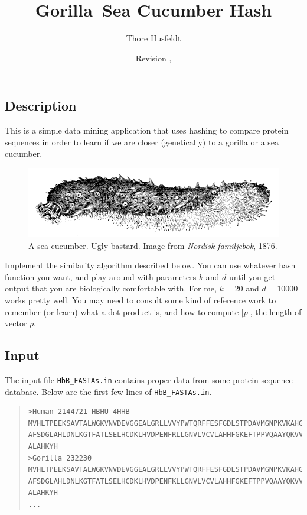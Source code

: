 \documentclass{tufte-handout}
\title{Gorilla--Sea Cucumber Hash}
\author{Thore Husfeldt}
\date{\small Revision \GITAbrHash, \GITAuthorDate}
\begin{document}
\maketitle

\subsection{Description}
This is a simple data mining application that uses hashing to compare protein sequences in order to learn if we are closer (genetically) to a gorilla or a sea cucumber.

\begin{figure}
  \includegraphics[width=\textwidth]{sea_cucumber.png}
  \caption{A sea cucumber. Ugly bastard.
  Image from \emph{Nordisk familjebok}, 1876.}
\end{figure}

Implement the similarity algorithm described below.
You can use whatever hash function you want, and play around with parameters $k$ and $d$ until you get output that you are biologically comfortable with.
For me, $k=20$ and $d=10000$ works pretty well.
You may need to consult some kind of reference work to remember (or learn) what a dot product is, and how to compute $|p|$, the length of vector $p$.

\subsection{Input}
The input file {\tt HbB\_FASTAs.in} contains proper data from some protein sequence database.
Below are the first few lines of {\tt HbB\_FASTAs.in}.

\begin{fullwidth}
  \begin{quote}
\begin{verbatim}
>Human 2144721 HBHU 4HHB
MVHLTPEEKSAVTALWGKVNVDEVGGEALGRLLVVYPWTQRFFESFGDLSTPDAVMGNPKVKAHGKKVLG
AFSDGLAHLDNLKGTFATLSELHCDKLHVDPENFRLLGNVLVCVLAHHFGKEFTPPVQAAYQKVVAGVAN
ALAHKYH
>Gorilla 232230
MVHLTPEEKSAVTALWGKVNVDEVGGEALGRLLVVYPWTQRFFESFGDLSTPDAVMGNPKVKAHGKKVLG
AFSDGLAHLDNLKGTFATLSELHCDKLHVDPENFKLLGNVLVCVLAHHFGKEFTPPVQAAYQKVVAGVAN
ALAHKYH
...
\end{verbatim}
\end{quote}
\end{fullwidth}
\end{document}
